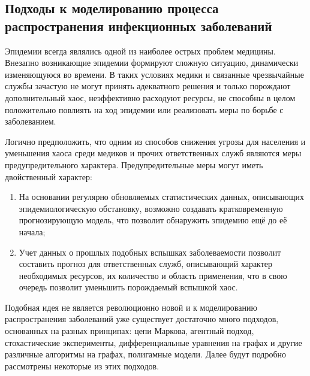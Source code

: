 \newpage
\parindent=1cm %
\begin{center}
		
		\section{Подходы к моделированию процесса распространения инфекционных заболеваний}
		
\end{center}

Эпидемии всегда являлись одной из наиболее острых проблем медицины. Внезапно возникающие эпидемии формируют сложную ситуацию, динамически изменяющуюся во времени. В таких условиях медики и связанные чрезвычайные службы зачастую не могут принять адекватного решения и только порождают дополнительный хаос, неэффективно расходуют ресурсы, не способны в целом положительно повлиять на ход эпидемии или реализовать меры по борьбе с заболеванием. 


Логично предположить, что одним из способов снижения угрозы для населения и уменьшения хаоса среди медиков и прочих ответственных служб являются меры предупредительного характера. Предупредительные меры могут иметь двойственный характер: 
\begin{enumerate}
	\item На основании регулярно обновляемых статистических данных, описывающих эпидемиологическую обстановку, возможно создавать кратковременную прогнозирующую модель, что позволит обнаружить эпидемию ещё до её начала;
	\item Учет данных о прошлых подобных вспышках заболеваемости позволит составить прогноз для ответственных служб, описывающий характер необходимых ресурсов, их количество и область применения, что в свою очередь позволит уменьшить порождаемый вспышкой хаос.
\end{enumerate}

Подобная идея не является революционно новой и  к моделированию распространения заболеваний уже  существует  достаточно много подходов, основанных на разных принципах: цепи Маркова, агентный подход, стохастические эксперименты, дифференциальные уравнения на графах и другие  различные алгоритмы на графах, полигамные модели. Далее будут подробно рассмотрены некоторые из этих подходов.

